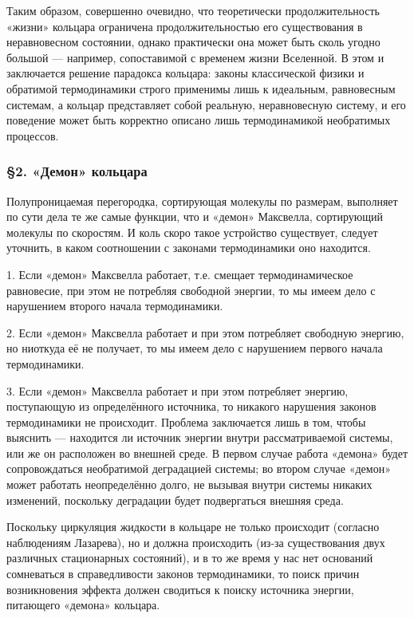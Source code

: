 \documentclass[12pt,a4paper]{article}
\begin{document}
Таким образом, совершенно очевидно, что теоретически продолжительность «жизни»
кольцара ограничена продолжительностью его существования в неравновесном
состоянии, однако практически она может быть сколь угодно большой — например,
сопоставимой с временем жизни Вселенной. В этом и заключается решение парадокса
кольцара: законы классической физики и обратимой термодинамики строго применимы
лишь к идеальным, равновесным системам, а кольцар представляет собой реальную,
неравновесную систему, и его поведение может быть корректно описано лишь
термодинамикой необратимых процессов.

\subsubsection*{§2. «Демон» кольцара}

Полупроницаемая перегородка, сортирующая молекулы по размерам, выполняет по
сути дела те же самые функции, что и «демон» Максвелла, сортирующий молекулы
по скоростям. И коль скоро такое устройство существует, следует уточнить, в
каком соотношении с законами термодинамики оно находится.

1. Если «демон» Максвелла работает, т.е. смещает термодинамическое равновесие,
при этом не потребляя свободной энергии, то мы имеем дело с нарушением второго
начала термодинамики.

2. Если «демон» Максвелла работает и при этом потребляет свободную энергию, но
ниоткуда её не получает, то мы имеем дело с нарушением первого начала
термодинамики.

3. Если «демон» Максвелла работает и при этом потребляет энергию, поступающую
из определённого источника, то никакого нарушения законов термодинамики не
происходит. Проблема заключается лишь в том, чтобы выяснить — находится ли
источник энергии внутри рассматриваемой системы, или же он расположен во
внешней среде. В первом случае работа «демона» будет сопровождаться
необратимой деградацией системы; во втором случае «демон» может работать
неопределённо долго, не вызывая внутри системы никаких изменений, поскольку
деградации будет подвергаться внешняя среда.

Поскольку циркуляция жидкости в кольцаре не только происходит (согласно
наблюдениям Лазарева), но и должна происходить (из-за существования двух
различных стационарных состояний), и в то же время у нас нет оснований
сомневаться в справедливости законов термодинамики, то поиск причин
возникновения эффекта должен сводиться к поиску источника энергии, питающего
«демона» кольцара.
\end{document}
